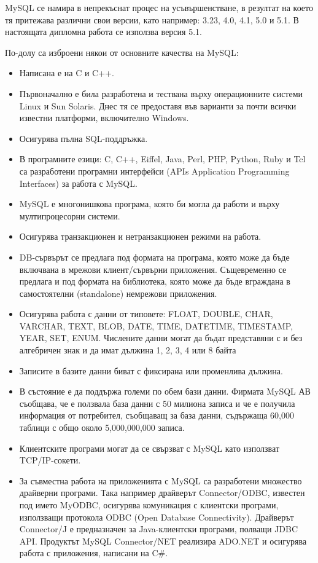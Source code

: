 MySQL се намира в непрекъснат процес на усъвършенстване, в резултат на
което тя притежава различни свои версии, като например: 3.23, 4.0,
4.1, 5.0 и 5.1. В настоящата дипломна работа се използва версия 5.1.

По-долу са изброени някои от основните качества на MySQL:
\begin{itemize}
\item Написана е на C и C++.

\item Първоначално е била разработена и тествана върху операционните системи
Linux и Sun Solaris. Днес тя се предоставя във варианти за почти
всички известни платформи, включително Windows.

\item Осигурява пълна SQL-поддръжка.

\item В програмните езици: C, C++, Eiffel, Java, Perl, PHP, Python, Ruby и
Tcl са разработени програмни интерфейси (APIs Application Programming
Interfaces) за работа с MySQL.

\item MySQL е многонишкова програма, която би могла да работи и върху
мултипроцесорни системи.

\item Осигурява транзакционен и нетранзакционен режими на работа.

\item DB-сървърът се предлага под формата на програма, която може да бъде
включвана в мрежови клиент/сървърни приложения. Същевременно се
предлага и под формата на библиотека, която може да бъде вграждана в
самостоятелни (standalone) немрежови приложения.

\item Осигурява работа с данни от типовете: FLOAT, DOUBLE, CHAR, VARCHAR,
TEXT, BLOB, DATE, TIME, DATETIME, TIMESTAMP, YEAR, SET,
ENUM. Числените данни могат да бъдат представяни с и без алгебричен
знак и да имат дължина 1, 2, 3, 4 или 8 байта

\item Записите в базите данни биват с фиксирана или променлива дължина.

\item В състояние е да поддържа големи по обем бази данни. Фирмата MySQL АВ
съобщава, че е ползвала база данни с 50 милиона записа и че е получила
информация от потребител, съобщаващ за база данни, съдържаща 60,000
таблици с общо около 5,000,000,000 записа.

\item Клиентските програми могат да се свързват с MySQL като използват TCP/IP-сокети.

\item За съвместна работа на приложенията с MySQL са разработени множество
драйверни програми. Така например драйверът Connector/ODBC, известен
под името MyODBC, осигурява комуникация с клиентски програми,
използващи протокола ODBC (Open Database Connectivity). Драйверът
Connector/J е предназначен за Java-клиентски програми, полващи JDBC
API. Продуктът MySQL Connector/NET реализира ADO.NET и осигурява
работа с приложения, написани на C\#.
\end{itemize}
